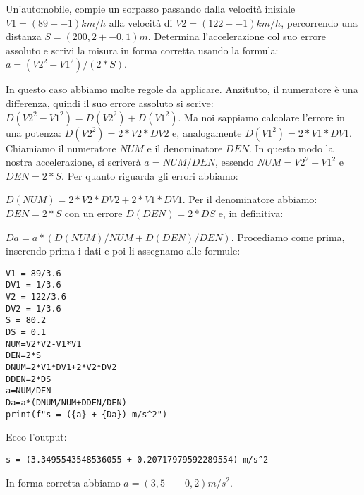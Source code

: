 \begin{testexample}

Un'automobile, compie un sorpasso passando dalla velocità iniziale $V1=(89 +-1 )km/h$ alla velocità di $V2=(122 +-1) km/h$, percorrendo una distanza $S = (200,2 +- 0,1 ) m$.  Determina l'accelerazione col suo errore assoluto e scrivi la misura in forma corretta usando la formula: $a = (V2^2 -V1^2)/(2*S)$.

In questo caso abbiamo molte regole da applicare. Anzitutto, il numeratore è una differenza, quindi il suo errore assoluto si scrive: $D(V2^2-V1^2)=D(V2^2) +D(V1^2)$. Ma noi sappiamo calcolare l'errore in una potenza: $D(V2^2) = 2*V2*DV2$ e, analogamente $D(V1^2)=2*V1*DV1$. Chiamiamo il numeratore $NUM$ e il denominatore $DEN$. In questo modo la nostra accelerazione, si scriverà $a = NUM/DEN$, essendo $NUM=V2^2 -V1^2$ e $DEN = 2*S$. Per quanto riguarda gli errori abbiamo:

$D(NUM) = 2*V2*DV2 +2*V1*DV1$. Per il denominatore abbiamo: $DEN = 2*S$ con un errore $D(DEN)= 2*DS$ e, in definitiva:

$Da = a*(D(NUM)/NUM +D(DEN)/DEN)$. Procediamo come prima, inserendo prima i dati e poi li assegnamo alle formule:

\begin{verbatim}
V1 = 89/3.6
DV1 = 1/3.6
V2 = 122/3.6
DV2 = 1/3.6
S = 80.2
DS = 0.1
NUM=V2*V2-V1*V1
DEN=2*S
DNUM=2*V1*DV1+2*V2*DV2
DDEN=2*DS
a=NUM/DEN
Da=a*(DNUM/NUM+DDEN/DEN)
print(f"s = ({a} +-{Da}) m/s^2")
\end{verbatim}
Ecco l'output:
\begin{verbatim}
s = (3.3495543548536055 +-0.20717979592289554) m/s^2
\end{verbatim}
In forma corretta abbiamo $a = ( 3,5 +- 0,2) m/s^2$.



\end{testexample}


